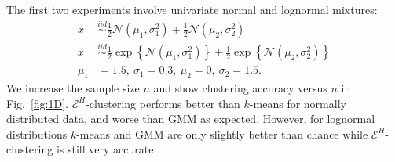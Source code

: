 \documentclass[twoside]{article}
\begin{document}
The first two experiments involve univariate
normal and lognormal mixtures:
\begin{align}
x &\stackrel{iid}{\sim} \tfrac{1}{2}
\mathcal{N}(\mu_1,\sigma_1^2) + 
\tfrac{1}{2} \mathcal{N}(\mu_2,\sigma_2^2) \label{eq:uni_normal} \\
x & \stackrel{iid}{\sim} \tfrac{1}{2}
\exp\left\{ \mathcal{N}(\mu_1,\sigma_1^2) \right\} + 
\tfrac{1}{2} \exp \left\{ \mathcal{N}(\mu_2,\sigma_2^2)\right\} 
\label{eq:uni_lognormal} \\
\mu_1 &= 1.5, \ \sigma_1=0.3, \ \mu_2=0, \ \sigma_2=1.5.
\end{align}
We increase the sample size $n$ and show clustering accuracy 
versus $n$ in Fig.~\ref{fig:1D}. $\mathcal{E}^H$-clustering 
performs better than $k$-means for normally distributed data, 
and worse than GMM 
as expected. 
However, for lognormal distributions $k$-means and GMM are only slightly
better than chance while $\mathcal{E}^H$-clustering is still very
accurate.
\end{document}

